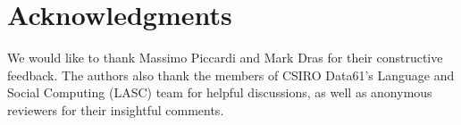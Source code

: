 \documentclass[11pt,a4paper]{article}
\begin{document}
\section*{Acknowledgments} 
We would like to thank Massimo Piccardi and Mark Dras for their constructive feedback. The authors also thank the members of CSIRO Data61's Language and Social Computing (LASC) team for helpful discussions, as well as anonymous reviewers for their insightful comments.



\end{document}
